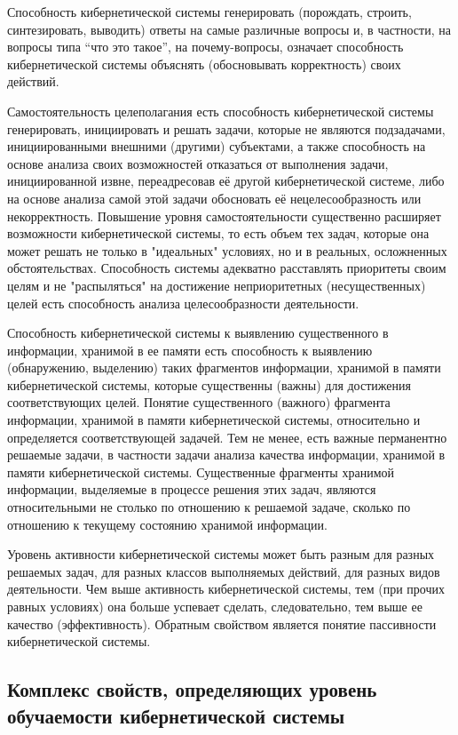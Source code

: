 Способность кибернетической системы генерировать (порождать, строить, синтезировать, выводить) ответы на самые различные вопросы и, в частности, на вопросы типа “что это такое”{}, на почему-вопросы, означает способность кибернетической системы объяснять (обосновывать корректность) своих действий.

Самостоятельность целеполагания есть способность кибернетической системы генерировать, инициировать и решать задачи, которые не являются подзадачами, инициированными внешними (другими) субъектами, а также способность на основе анализа своих возможностей отказаться от выполнения задачи, инициированной извне, переадресовав её другой кибернетической системе, либо на основе анализа самой этой задачи обосновать её нецелесообразность или некорректность. 
Повышение уровня самостоятельности существенно расширяет возможности кибернетической системы, то есть объем тех задач, которые она может решать не только в "идеальных"{} условиях, но и в реальных, осложненных обстоятельствах.
Способность системы адекватно расставлять приоритеты своим целям и не "распыляться"{} на достижение неприоритетных (несущественных) целей есть способность анализа целесообразности деятельности.

Способность кибернетической системы к выявлению существенного в информации, хранимой в ее памяти есть способность к выявлению (обнаружению, выделению) таких фрагментов информации, хранимой в памяти кибернетической системы, которые существенны (важны) для достижения соответствующих целей.
Понятие существенного (важного) фрагмента информации, хранимой в памяти кибернетической системы, относительно и определяется соответствующей задачей.
Тем не менее, есть важные перманентно решаемые задачи, в частности задачи анализа качества информации, хранимой в памяти кибернетической системы.
Существенные фрагменты хранимой информации, выделяемые в процессе решения этих задач, являются относительными не столько по отношению к решаемой задаче, сколько по отношению к текущему состоянию хранимой информации.

Уровень активности кибернетической системы может быть разным для разных решаемых задач, для разных классов выполняемых действий, для разных видов деятельности. 
Чем выше активность кибернетической системы, тем (при прочих равных условиях) она больше успевает сделать, следовательно, тем выше ее качество (эффективность).
Обратным свойством является понятие пассивности кибернетической системы. 


\subsection{Комплекс свойств, определяющих уровень обучаемости кибернетической системы}
{\label{sec_cyb_syst_learnability_quality}} 

